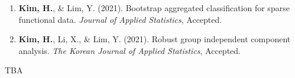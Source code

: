 \documentclass[11pt, a4paper]{awesome-cv} %
\begin{document}
%
%	
%	
%

%

\begin{enumerate}
	\item {\bf Kim, H.}, \& Lim, Y. (2021). Bootstrap aggregated classification for sparse functional data. {\em Journal of Applied Statistics}, Accepted.
	\item {\bf Kim, H.}, Li, X., \& Lim, Y. (2021). Robust group independent component analysis. {\em The Korean Journal of Applied Statistics}, Accepted.
\end{enumerate}




TBA
%	
\end{document}
